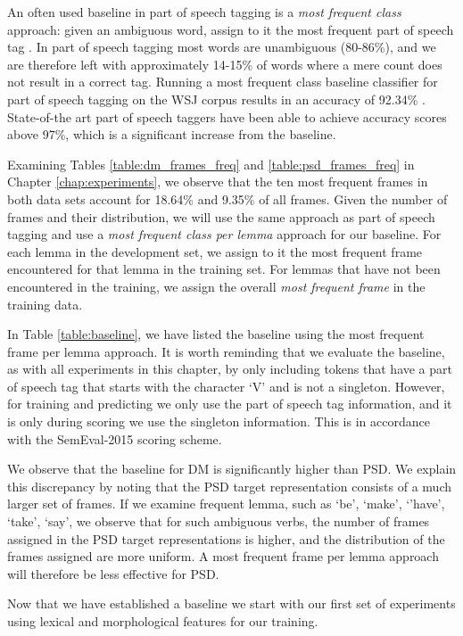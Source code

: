 An often used baseline in part of speech tagging is a \textit{most frequent class} approach: given an ambiguous word, assign to it the most frequent part of speech tag \cite{Jur:Mar:09}. In part of speech tagging most words are unambiguous (80-86\%), and we are therefore left with approximately 14-15\% of words where a mere count does not result in a correct tag. Running a most frequent class baseline classifier for part of speech tagging on the WSJ corpus results in an accuracy of 92.34\% \cite{Jur:Mar:09}. State-of-the art part of speech taggers have been able to achieve accuracy scores above 97\%, which is a significant increase from the baseline.

Examining Tables \ref{table:dm_frames_freq} and \ref{table:psd_frames_freq} in Chapter \ref{chap:experiments}, we observe that the ten most frequent frames in both data sets account for 18.64\% and 9.35\% of all frames. Given the number of frames and their distribution, we will use the same approach as part of speech tagging and use a \textit{most frequent class per lemma} approach for our baseline. For each lemma in the development set, we assign to it the most frequent frame encountered for that lemma in the training set. For lemmas that have not been encountered in the training, we assign the overall \textit{most frequent frame} in the training data.

In Table \ref{table:baseline}, we have listed the baseline using the most frequent frame per lemma approach. It is worth reminding that we evaluate the baseline, as with all experiments in this chapter, by only including tokens that have a part of speech tag that starts with the character `V' and is not a singleton. However, for training and predicting we only use the part of speech tag information, and it is only during scoring we use the singleton information. This is in accordance with the SemEval-2015 scoring scheme.

We observe that the baseline for DM is significantly higher than PSD. We explain this discrepancy by noting that the PSD target representation consists of a much larger set of frames. If we examine frequent lemma, such as `be', `make', `'have', `take', `say', we observe that for such ambiguous verbs, the number of frames assigned in the PSD target representations is higher, and the distribution of the frames assigned are more uniform. A most frequent frame per lemma approach will therefore be less effective for PSD.

Now that we have established a baseline we start with our first set of experiments using lexical and morphological features for our training.



